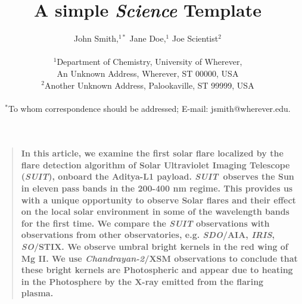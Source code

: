 \documentclass[12pt]{article}
\title{A simple {\it Science\/} Template}
\author
{John Smith,$^{1\ast}$ Jane Doe,$^{1}$ Joe Scientist$^{2}$\\
\\
\normalsize{$^{1}$Department of Chemistry, University of Wherever,}\\
\normalsize{An Unknown Address, Wherever, ST 00000, USA}\\
\normalsize{$^{2}$Another Unknown Address, Palookaville, ST 99999, USA}\\
\\
\normalsize{$^\ast$To whom correspondence should be addressed; E-mail:  jsmith@wherever.edu.}
}
\date{}
\newenvironment{sciabstract}{%
\begin{quote} \bf}
{\end{quote}}
\newcommand{\suit}{{\it{SUIT}}}
\begin{document}
 


\baselineskip24pt


\maketitle 




\begin{sciabstract}
  In this article, we examine the first solar flare localized by the flare detection algorithm of Solar Ultraviolet Imaging Telescope (\suit), onboard the Aditya-L1 payload. \suit~observes the Sun in eleven pass bands in the 200-400 nm regime. This provides us with a unique opportunity to observe Solar flares and their effect on the local solar environment in some of the wavelength bands for the first time. We compare the {\it SUIT} observations with observations from other observatories, e.g. {\it SDO}/AIA, {\it IRIS}, {\it SO}/STIX. We observe umbral bright kernels in the red wing of Mg II. We use {\it Chandrayan-2}/XSM observations to conclude that these bright kernels are Photospheric and appear due to heating in the Photosphere by the X-ray emitted from the flaring plasma.
\end{sciabstract}



\end{document}
